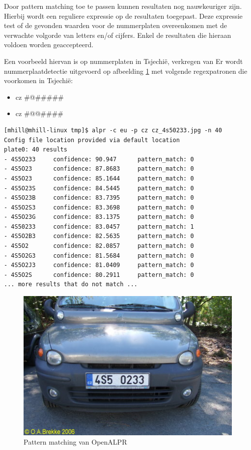 Door pattern matching toe te passen kunnen resultaten nog nauwkeuriger zijn. Hierbij wordt een reguliere expressie op de resultaten toegepast. Deze expressie test of de gevonden waarden voor de nummerplaten overeenkomen met de verwachte volgorde van letters en/of cijfers. Enkel de resultaten die hieraan voldoen worden geaccepteerd.

Een voorbeeld hiervan is op nummerplaten in Tsjechië, verkregen van \textcite{openalpr2015pattern}
Er wordt nummerplaatdetectie uitgevoerd op afbeelding \ref{patternmatching} met volgende regexpatronen die voorkomen in Tsjechië:
\begin{itemize}
	\item cz \#@\#\#\#\#\#
	\item cz \#@@\#\#\#\#
\end{itemize}

\begin{lstlisting}
[mhill@mhill-linux tmp]$ alpr -c eu -p cz cz_4s50233.jpg -n 40
Config file location provided via default location
plate0: 40 results
- 4S5O233     confidence: 90.947      pattern_match: 0
- 4S5O23      confidence: 87.8683     pattern_match: 0
- 4S5O23      confidence: 85.1644     pattern_match: 0
- 4S5O23S     confidence: 84.5445     pattern_match: 0
- 4S5O23B     confidence: 83.7395     pattern_match: 0
- 4S5O2S3     confidence: 83.3698     pattern_match: 0
- 4S5O23G     confidence: 83.1375     pattern_match: 0
- 4S50233     confidence: 83.0457     pattern_match: 1
- 4S5O2B3     confidence: 82.5635     pattern_match: 0
- 4S5O2       confidence: 82.0857     pattern_match: 0
- 4S5O2G3     confidence: 81.5684     pattern_match: 0
- 4S5O2J3     confidence: 81.0409     pattern_match: 0
- 4S5O2S      confidence: 80.2911     pattern_match: 0
... more results that do not match ...
\end{lstlisting}

\begin{figure}[h!]
	\centering
	\includegraphics[width=\linewidth]{img/pattern-matching.jpg}
	\caption{Pattern matching van OpenALPR \autocite{openalpr2015pattern}}
	\label{patternmatching}
\end{figure}

